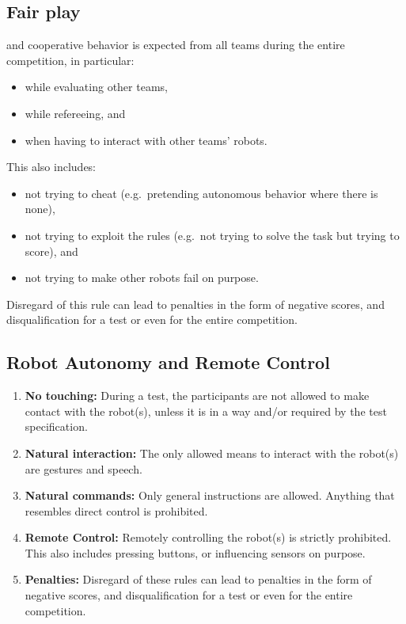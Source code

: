 \subsection{Fair play}
\label{rule:fairplay}
 and cooperative behavior is expected from all teams during the entire competition, in particular:
\begin{itemize}
	\item while evaluating other teams, 
	\item while refereeing, and 
	\item when having to interact with other teams' robots.  
\end{itemize}
This also includes:
\begin{itemize}
	\item not trying to cheat (e.g.~pretending autonomous behavior where there is none), 
	\item not trying to exploit the rules (e.g.~not trying to solve the task but trying to score), and 
	\item not trying to make other robots fail on purpose. 
\end{itemize}
Disregard of this rule can lead to penalties in the form of negative scores, and disqualification for a test or even for the entire competition. 

\subsection{Robot Autonomy and Remote Control}
\begin{enumerate}
	\item \textbf{No touching:} During a test, the participants are not allowed to make contact with the robot(s), unless it is in a  way and/or required by the test specification. 
	\item \textbf{Natural interaction:} The only allowed means to interact with the robot(s) are gestures and speech.
	\item \textbf{Natural commands:} Only general instructions are allowed. 
	Anything that resembles direct control is prohibited.
	\item \textbf{Remote Control:} Remotely controlling the robot(s) is strictly prohibited. This also includes pressing buttons, or influencing sensors on purpose.
	\item \textbf{Penalties:} Disregard of these rules can lead to penalties in the form of negative scores, and disqualification for a test or even for the entire competition. 
\end{enumerate}

